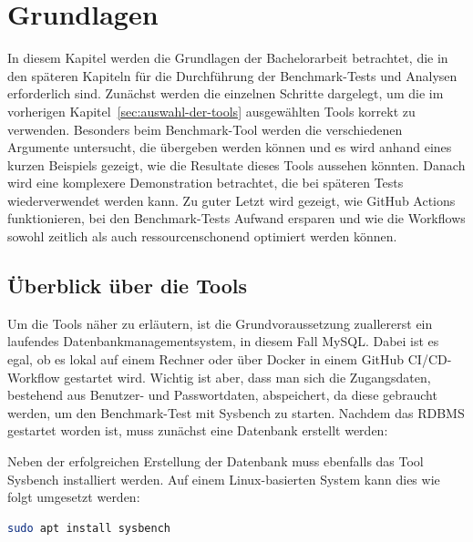 \chapter{Grundlagen}\label{ch:grundlagen}

In diesem Kapitel werden die Grundlagen der Bachelorarbeit betrachtet, die in den späteren Kapiteln für die Durchführung der Benchmark-Tests und Analysen erforderlich sind.
Zunächst werden die einzelnen Schritte dargelegt, um die im vorherigen Kapitel~\ref{sec:auswahl-der-tools} ausgewählten Tools korrekt zu verwenden.
Besonders beim Benchmark-Tool werden die verschiedenen Argumente untersucht, die übergeben werden können und es wird anhand eines kurzen Beispiels gezeigt, wie die Resultate dieses Tools aussehen könnten.
Danach wird eine komplexere Demonstration betrachtet, die bei späteren Tests wiederverwendet werden kann.
Zu guter Letzt wird gezeigt, wie GitHub Actions funktionieren, bei den Benchmark-Tests Aufwand ersparen und wie die Workflows sowohl zeitlich als auch ressourcenschonend optimiert werden können.

\section{Überblick über die Tools}\label{sec:einfuhrung-in-die-tools}

Um die Tools näher zu erläutern, ist die Grundvoraussetzung zuallererst ein laufendes Datenbankmanagementsystem, in diesem Fall MySQL\@.
Dabei ist es egal, ob es lokal auf einem Rechner oder über Docker in einem GitHub CI/CD-Workflow gestartet wird.
Wichtig ist aber, dass man sich die Zugangsdaten, bestehend aus Benutzer- und Passwortdaten, abspeichert, da diese gebraucht werden, um den Benchmark-Test mit Sysbench zu starten.
Nachdem das RDBMS gestartet worden ist, muss zunächst eine Datenbank erstellt werden:

\vspace{-4pt}

\vspace{-8pt}

Neben der erfolgreichen Erstellung der Datenbank muss ebenfalls das Tool Sysbench installiert werden.
Auf einem Linux-basierten System kann dies wie folgt umgesetzt werden:

\vspace{-4pt}
\begin{lstlisting}[language=bash]
sudo apt install sysbench
\end{lstlisting}
\vspace{-8pt}

